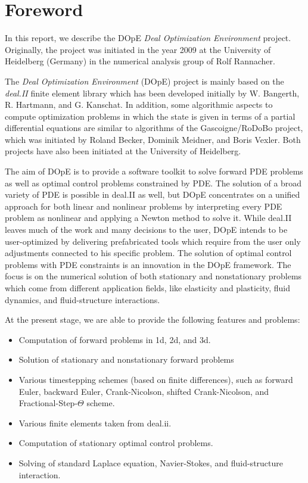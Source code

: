 \chapter{Foreword}
In this report, we describe the DOpE
\textit{Deal Optimization Environment} project. 
Originally, the project was initiated in the year 2009 at the 
University of Heidelberg (Germany) in the numerical analysis
group of Rolf Rannacher. 

The \textit{Deal Optimization Environment} (DOpE) project is mainly 
based on the
\textit{deal.II} finite element library which has been developed initially
by W. Bangerth, R. Hartmann, and G. Kanschat. 
In addition, some algorithmic aspects to compute optimization problems
in which the state is given in terms of a partial
differential equations are similar to algorithms of the
Gascoigne/RoDoBo 
project, which was initiated by 
Roland Becker, Dominik Meidner,  and Boris Vexler. 
Both projects have also been 
initiated at the University of Heidelberg. 

The aim of DOpE is to provide a software toolkit to solve forward PDE
problems as well as optimal control problems constrained by PDE. The
solution of a broad variety of PDE is possible in deal.II as well, but
DOpE concentrates on a unified approach for both linear and nonlinear
problems by interpreting every PDE problem as nonlinear and applying a
Newton method to solve it. While deal.II leaves much of the work and many
decisions to the user, DOpE intends to be user-optimized by delivering
prefabricated tools which require from the user only adjustments connected
to his specific problem. The solution of optimal control problems with PDE
constraints is an innovation in the DOpE framework.
The focus is on the numerical solution of both stationary and nonstationary
problems which come from different application fields, like elasticity and
plasticity, fluid dynamics, and fluid-structure interactions.

At the present stage, we are able to provide the following features and 
problems:
\begin{itemize}
\item Computation of forward problems in 1d, 2d, and 3d.
\item Solution of stationary and nonstationary forward problems
\item Various timestepping schemes (based on finite differences), 
  such as forward Euler, backward Euler,
  Crank-Nicolson, shifted Crank-Nicolson, and Fractional-Step-$\Theta$ scheme.
\item Various finite elements taken from deal.ii.
\item Computation of stationary optimal control problems.
\item Solving of standard Laplace equation, Navier-Stokes, and 
fluid-structure interaction. 
\end{itemize}
 
